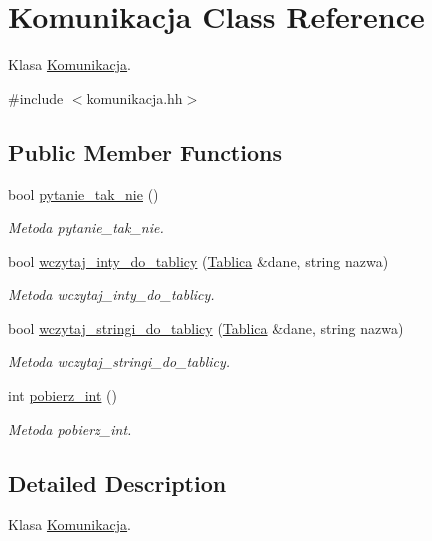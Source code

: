 \hypertarget{class_komunikacja}{\section{Komunikacja Class Reference}
\label{class_komunikacja}
}


Klasa \hyperlink{class_komunikacja}{Komunikacja}.  




{\ttfamily \#include $<$komunikacja.\-hh$>$}

\subsection*{Public Member Functions}
\begin{DoxyCompactItemize}
\item 
bool \hyperlink{class_komunikacja_a22554e7095eccc02f899a5022382fe0e}{pytanie\-\_\-tak\-\_\-nie} ()
\begin{DoxyCompactList}\small\item\em Metoda pytanie\-\_\-tak\-\_\-nie. \end{DoxyCompactList}\item 
bool \hyperlink{class_komunikacja_a584a632826e92cf838e64368b8abbe05}{wczytaj\-\_\-inty\-\_\-do\-\_\-tablicy} (\hyperlink{class_tablica}{Tablica} \&dane, string nazwa)
\begin{DoxyCompactList}\small\item\em Metoda wczytaj\-\_\-inty\-\_\-do\-\_\-tablicy. \end{DoxyCompactList}\item 
bool \hyperlink{class_komunikacja_a72e1facbd11615a383ed799d490aed52}{wczytaj\-\_\-stringi\-\_\-do\-\_\-tablicy} (\hyperlink{class_tablica}{Tablica} \&dane, string nazwa)
\begin{DoxyCompactList}\small\item\em Metoda wczytaj\-\_\-stringi\-\_\-do\-\_\-tablicy. \end{DoxyCompactList}\item 
int \hyperlink{class_komunikacja_a28d01913291afd05c5069182fd29506b}{pobierz\-\_\-int} ()
\begin{DoxyCompactList}\small\item\em Metoda pobierz\-\_\-int. \end{DoxyCompactList}\end{DoxyCompactItemize}


\subsection{Detailed Description}
Klasa \hyperlink{class_komunikacja}{Komunikacja}. 

